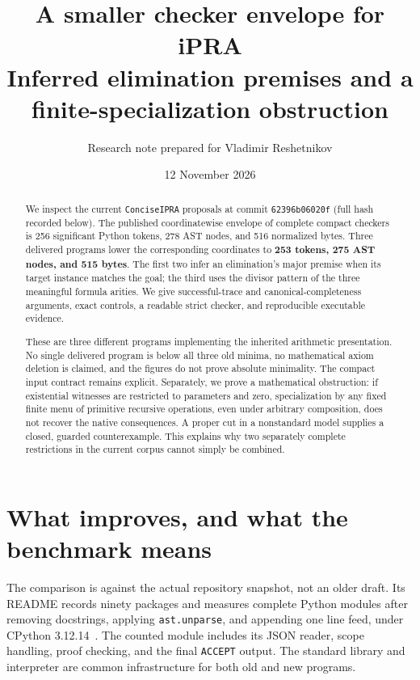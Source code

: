 \documentclass[11pt]{article}
\title{A smaller checker envelope for iPRA\\[0.4em]
\large Inferred elimination premises and a finite-specialization obstruction}
\author{Research note prepared for Vladimir Reshetnikov}
\date{12 November 2026}
\theoremstyle{definition}
\theoremstyle{remark}
\begin{document}
\maketitle
\begin{abstract}
We inspect the current \texttt{ConciseIPRA} proposals at commit
\texttt{62396b06020f} (full hash recorded below).
The published coordinatewise envelope of complete compact checkers is
256 significant Python tokens, 278 AST nodes, and 516 normalized bytes.
Three delivered programs lower the corresponding coordinates to
\textbf{253 tokens, 275 AST nodes, and 515 bytes}.  The first two infer
an elimination's major premise when its target instance matches the goal;
the third uses the divisor pattern of the three meaningful formula arities.
We give successful-trace and canonical-completeness arguments, exact
controls, a readable strict checker, and reproducible executable evidence.

These are three different programs implementing the inherited arithmetic
presentation.  No single delivered program is below all three old minima,
no mathematical axiom deletion is claimed, and the figures do not prove
absolute minimality.  The compact input contract remains explicit.
Separately, we prove a mathematical obstruction: if existential witnesses
are restricted to parameters and zero, specialization by any fixed finite
menu of primitive recursive operations, even under arbitrary composition,
does not recover the native consequences.  A proper cut in a nonstandard
model supplies a closed, guarded counterexample.  This explains why two
separately complete restrictions in the current corpus cannot simply be
combined.
\end{abstract}

\section{What improves, and what the benchmark means}

The comparison is against the actual repository snapshot, not an older
draft.  Its README records ninety packages and measures complete Python
modules after removing docstrings, applying \texttt{ast.unparse}, and
appending one line feed, under CPython 3.12.14~\cite{repo}.
The counted module includes its JSON reader, scope handling, proof checking,
and the final \texttt{ACCEPT} output.  The standard library and interpreter
are common infrastructure for both old and new programs.
\end{document}
